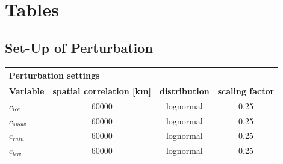 \chapter{Tables}
\label{sec:tabelappendix}
 \section{Set-Up of Perturbation}
\begin{longtable}[H]{|l|c|c|c|}
    \hline 
    \multicolumn{4}{|l|}{\textbf{Perturbation settings}}\\
    \hline 
    \textbf{Variable} & \textbf{spatial correlation [km]} & \textbf{distribution} & \textbf{scaling factor} \\ 
    \hline
    $c_{ice}$ & 60000 & lognormal & 0.25 \\
    \hline
    $c_{snow}$ & 60000 & lognormal & 0.25 \\
    \hline
    $c_{rain}$ & 60000 & lognormal & 0.25 \\
    \hline
    $c_{lcw}$ & 60000 & lognormal & 0.25 \\
    \hline


\end{longtable}
